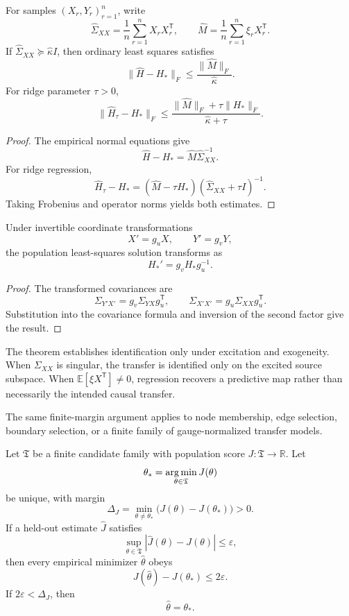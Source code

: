\begin{corollary}
\label{cor:empirical-transfer-bound}
For samples \((X_r,Y_r)_{r=1}^n\), write
\[
\widehat\Sigma_{XX}
=
\frac1n\sum_{r=1}^nX_rX_r^{\mathsf T},
\qquad
\widehat M
=
\frac1n\sum_{r=1}^n\xi_rX_r^{\mathsf T}.
\]
If \(\widehat\Sigma_{XX}\succeq\widehat\kappa I\), then ordinary least squares
satisfies
\[
\boxed{
\|\widehat H-H_*\|_F
\leq
\frac{\|\widehat M\|_F}{\widehat\kappa}.
}
\]
For ridge parameter \(\tau>0\),
\[
\boxed{
\|\widehat H_\tau-H_*\|_F
\leq
\frac{
\|\widehat M\|_F+\tau\|H_*\|_F
}{
\widehat\kappa+\tau
}.
}
\]
\end{corollary}

\begin{proof}
The empirical normal equations give
\[
\widehat H-H_*
=
\widehat M\widehat\Sigma_{XX}^{-1}.
\]
For ridge regression,
\[
\widehat H_\tau-H_*
=
(\widehat M-\tau H_*)
(\widehat\Sigma_{XX}+\tau I)^{-1}.
\]
Taking Frobenius and operator norms yields both estimates.
\end{proof}

\begin{proposition}
\label{prop:ols-gauge-covariance}
Under invertible coordinate transformations
\[
X'=g_uX,
\qquad
Y'=g_vY,
\]
the population least-squares solution transforms as
\[
H_*'=g_vH_*g_u^{-1}.
\]
\end{proposition}

\begin{proof}
The transformed covariances are
\[
\Sigma_{Y'X'}=g_v\Sigma_{YX}g_u^{\mathsf T},
\qquad
\Sigma_{X'X'}=g_u\Sigma_{XX}g_u^{\mathsf T}.
\]
Substitution into the covariance formula and inversion of the second factor
give the result.
\end{proof}

The theorem establishes identification only under excitation and exogeneity.
When \(\Sigma_{XX}\) is singular, the transfer is identified only on the
excited source subspace. When \(\mathbb E[\xi X^{\mathsf T}]\neq0\), regression
recovers a predictive map rather than necessarily the intended causal
transfer.


The same finite-margin argument applies to node membership, edge selection,
boundary selection, or a finite family of gauge-normalized transfer models.

\begin{theorem}
\label{thm:uniform-structure-selection}
Let \(\mathfrak T\) be a finite candidate family with population score
\(J:\mathfrak T\to\mathbb R\). Let
\[
\theta_*
=
\operatorname*{arg\,min}_{\theta\in\mathfrak T}J(\theta)
\]
be unique, with margin
\[
\Delta_J
=
\min_{\theta\neq\theta_*}
\bigl(J(\theta)-J(\theta_*)\bigr)>0.
\]
If a held-out estimate \(\widehat J\) satisfies
\[
\sup_{\theta\in\mathfrak T}
|\widehat J(\theta)-J(\theta)|
\leq\varepsilon,
\]
then every empirical minimizer \(\widehat\theta\) obeys
\[
\boxed{
J(\widehat\theta)-J(\theta_*)
\leq2\varepsilon.
}
\]
If \(2\varepsilon<\Delta_J\), then
\[
\boxed{\widehat\theta=\theta_*.}
\]
\end{theorem}

